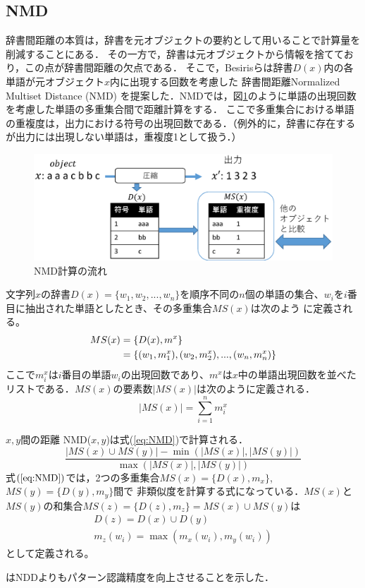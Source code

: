 \subsection{NMD} %
\label{sec:nmd}
辞書間距離の本質は，辞書を元オブジェクトの要約として用いることで計算量を削減することにある．
その一方で，辞書は元オブジェクトから情報を捨てており，この点が辞書間距離の欠点である．
そこで，Besirisらは辞書$D(x)$内の各単語が元オブジェクト$x$内に出現する回数を考慮した
辞書間距離Normalized Multiset Distance (NMD) \cite{NMD}を提案した．NMDでは，図\ref{fig:image/CalcNMD.eps}のように単語の出現回数を考慮した単語の多重集合間で距離計算をする．
ここで多重集合における単語の重複度は，出力における符号の出現回数である．（例外的に，辞書に存在するが出力には出現しない単語は，重複度1として扱う．）
\begin{figure}[tb]
\begin{center}
\includegraphics[clip, width=\columnwidth]{image/CalcNMD.eps}
\caption{NMD計算の流れ}
\label{fig:image/CalcNMD.eps}
\end{center}
\end{figure}

文字列$x$の辞書$D(x) = \{w_1,w_2,...,w_n\}$を順序不同の$n$個の単語の集合、$w_i$を$i$番目に抽出された単語としたとき、その多重集合$MS(x)$は次のよう
に定義される。
\begin{align}
MS(x)
&= \{D(x),m^x\} \notag \\
&= \{(w_1,m_1^x),(w_2,m_2^x),...,(w_n,m_n^x)\}
\end{align}
ここで$m_i^x$は$i$番目の単語$w_i$の出現回数であり、$m^x$は$x$中の単語出現回数を並べたリストである．$MS(x)$の要素数$|MS(x)|$は次のように定義される．
\begin{equation}
|MS(x)| = \sum_{i=1}^n m_i^x
\end{equation}

$x,y$間の距離 NMD($x,y$)は式(\ref{eq:NMD})で計算される．
\begin{equation}
\frac{|MS(x)\cup MS(y)| - \min(|MS(x)|,|MS(y)|)}{\max(|MS(x)|,|MS(y)|)}
\label{eq:NMD}
\end{equation}
式$(\ref{eq:NMD})$では，2つの多重集合$MS(x) = \{D(x),m_x\}$, $MS(y) = \{D(y),m_y\} $間で
非類似度を計算する式になっている．$MS(x)$と$MS(y)$の和集合$MS(z)= \{D(z),m_z\}=
MS(x)\cup MS(y)$は
\begin{gather}
\label{eq:x_cup_y_0}
D(z) = D(x)\cup D(y) \\\label{eq:x_cup_y_1}
m_z(w_i) = \max(m_x(w_i),m_y(w_i))
\end{gather}
として定義される。



\cite{NMD}はNDDよりもパターン認識精度を向上させることを示した．
